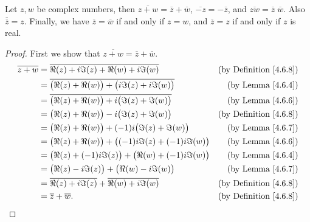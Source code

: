 \begin{lemma}\label{4.6.9}
    Let \(z, w\) be complex numbers, then \(\overline{z + w} = \overline{z} + \overline{w}\), \(\overline{-z} = -\overline{z}\), and \(\overline{zw} = \overline{z} \; \overline{w}\).
    Also \(\overline{\overline{z}} = z\).
    Finally, we have \(\overline{z} = \overline{w}\) if and only if \(z = w\), and \(\overline{z} = z\) if and only if \(z\) is real.
\end{lemma}

\begin{proof}
    First we show that \(\overline{z + w} = \overline{z} + \overline{w}\).
    \begin{align*}
        \overline{z + w} & = \overline{\Re(z) + i \Im(z) + \Re(w) + i \Im(w)}                     & \text{(by Definition \ref{4.6.8})} \\
                         & = \overline{\big(\Re(z) + \Re(w)\big) + \big(i \Im(z) + i \Im(w)\big)} & \text{(by Lemma \ref{4.6.4})}      \\
                         & = \overline{\big(\Re(z) + \Re(w)\big) + i \big(\Im(z) + \Im(w)\big)}   & \text{(by Lemma \ref{4.6.6})}      \\
                         & = \big(\Re(z) + \Re(w)\big) - i \big(\Im(z) + \Im(w)\big)              & \text{(by Definition \ref{4.6.8})} \\
                         & = \big(\Re(z) + \Re(w)\big) + (-1) i \big(\Im(z) + \Im(w)\big)         & \text{(by Lemma \ref{4.6.7})}      \\
                         & = \big(\Re(z) + \Re(w)\big) + \big((-1) i \Im(z) + (-1) i \Im(w)\big)  & \text{(by Lemma \ref{4.6.6})}      \\
                         & = \big(\Re(z) + (-1) i \Im(z)\big) + \big(\Re(w) + (-1) i \Im(w)\big)  & \text{(by Lemma \ref{4.6.4})}      \\
                         & = \big(\Re(z) - i \Im(z)\big) + \big(\Re(w) - i \Im(w)\big)            & \text{(by Lemma \ref{4.6.7})}      \\
                         & = \overline{\Re(z) + i \Im(z)} + \overline{\Re(w) + i \Im(w)}          & \text{(by Definition \ref{4.6.8})} \\
                         & = \overline{z} + \overline{w}.                                         & \text{(by Definition \ref{4.6.8})}
    \end{align*}


\end{proof}
